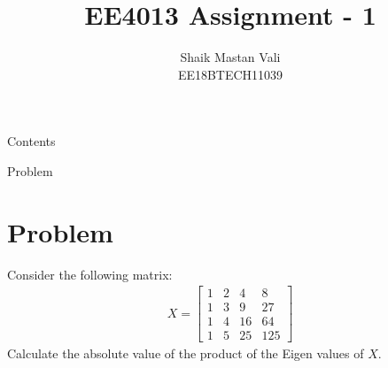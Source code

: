 \documentclass{beamer}
\author{Shaik Mastan Vali \\ EE18BTECH11039}
\title{EE4013 Assignment - 1}
\institute[]{IIT Hyderabad}
\begin{document}
\maketitle
\begin{frame}{Contents}
    \tableofcontents
\end{frame}

\begin{frame}{Problem}
    \section{Problem}
    Consider the following matrix:
    \begin{align*}
        X = \begin{bmatrix}
            1 & 2 & 4 & 8 \\
            1 & 3 & 9 & 27 \\
            1 & 4 & 16 & 64 \\
            1 & 5 & 25 & 125
        \end{bmatrix}
    \end{align*}
    Calculate the absolute value of the product of the Eigen values of $X$.
\end{frame}

% 

\end{document}
